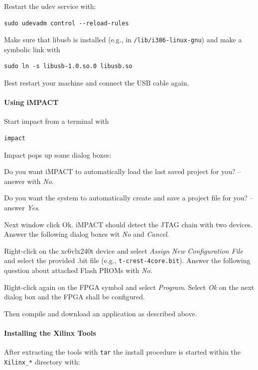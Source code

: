 \documentclass[a4paper,fontsize=10pt,twoside,DIV15,BCOR12mm,headinclude=true,footinclude=false,pagesize,bibtotoc]{scrbook}
\newcommand{\code}[1]{{\texttt{#1}}}
\begin{document}
Restart the udev service with:

\begin{verbatim} 
sudo udevadm control --reload-rules
\end{verbatim}

Make sure that libusb is installed (e.g., in \code{/lib/i386-linux-gnu}) and make a symbolic link with

\begin{verbatim} 
sudo ln -s libusb-1.0.so.0 libusb.so
\end{verbatim}

Best restart your machine and connect the USB cable again.

\paragraph{Using iMPACT}

Start impact from a terminal with 

\begin{verbatim} 
impact
\end{verbatim}

Impact pops up some dialog boxes:

Do you want iMPACT to automatically load the last saved project for you? -- answer with \emph{No}.

Do you want the system to automatically create and save a project file for you? -- answer \emph{Yes}.

Next window click Ok. iMPACT should detect the JTAG chain with two devices. Answer the
following dialog boxes wit \emph{No} and \emph{Cancel}.

Right-click on the xc6vlx240t device and select \emph{Assign New Configuration File} and select
the provided .bit file (e.g., \code{t-crest-4core.bit}). Answer the following question about attached
Flash PROMs with \emph{No}.

Right-click again on the FPGA symbol and select \emph{Program}. Select \emph{Ok} on the next
dialog box and the FPGA shall be configured.

Then compile and download an application as described above.

\paragraph{Installing the Xilinx Tools}

After extracting the tools with \code{tar} the install procedure is started within the
\code{Xilinx\_*} directory with:
\end{document}

